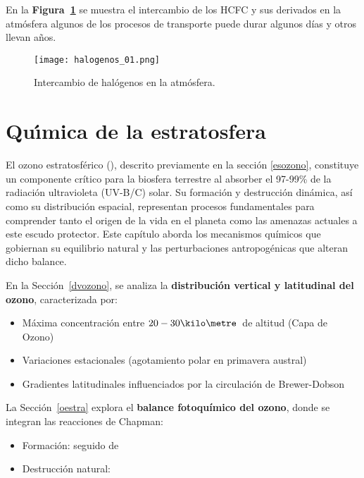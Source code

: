 En la \textbf{Figura~\ref{halo_01}} se muestra el intercambio de los HCFC y sus derivados en la atmósfera algunos de los procesos de transporte puede durar algunos días y otros llevan años.

\begin{figure}[htbp]
\begin{center}
\texttt{[image: halogenos\_01.png]}
\caption{Intercambio de halógenos en la atmósfera.}
\label{halo_01}
\end{center}
\end{figure}

%  
%  

\chapter[Quimica de la estatosfera]{Qu\'{\i}mica de la estratosfera}

El ozono estratosférico (), descrito previamente en la sección \ref{esozono}, constituye un componente crítico para la biosfera terrestre al absorber el 97-99\% de la radiación ultravioleta (UV-B/C) solar. Su formación y destrucción dinámica, así como su distribución espacial, representan procesos fundamentales para comprender tanto el origen de la vida en el planeta como las amenazas actuales a este escudo protector. Este capítulo aborda los mecanismos químicos que gobiernan su equilibrio natural y las perturbaciones antropogénicas que alteran dicho balance.

En la  Sección~\ref{dvozono}, se analiza la \textbf{distribución vertical y latitudinal del ozono}, caracterizada por:
\begin{itemize}
    \item Máxima concentración entre $20-30 \kilo\metre$\  de altitud (Capa de Ozono)
    \item Variaciones estacionales (agotamiento polar en primavera austral)
    \item Gradientes latitudinales influenciados por la circulación de Brewer-Dobson
\end{itemize}

La Sección~\ref{oestra} explora el \textbf{balance fotoquímico del ozono}, donde se integran las reacciones de Chapman:
\begin{itemize}
    \item Formación:  seguido de 
    \item Destrucción natural:  
\end{itemize}

